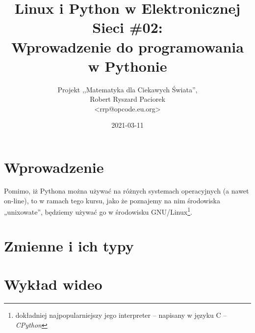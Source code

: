 \documentclass{pdfBooklets}
\title{Linux i Python w Elektronicznej Sieci \#02:\\ Wprowadzenie do programowania w Pythonie}
\author{%
	Projekt ,,Matematyka dla Ciekawych Świata'',\\
	Robert Ryszard Paciorek\\\normalsize\ttfamily <rrp@opcode.eu.org>
}
\date  {2021-03-11}
\begin{document}
\maketitle

\section{Wprowadzenie}



Pomimo, iż Pythona można używać na różnych systemach operacyjnych (a nawet on-line),
to w ramach tego kursu, jako że poznajemy na nim środowiska „unixowate”,
będziemy używać go w środowisku GNU/Linux\footnote{
	dokładniej najpopularniejszy jego interpreter – napisany w języku C – \textit{CPython}
}.





\section{Zmienne i ich typy}
	

\section{Wykład wideo}


\ZadaniaRozwiazaniaAuto[intro=booklets-sections/python/zadania-00-intro.tex]

\end{document}

